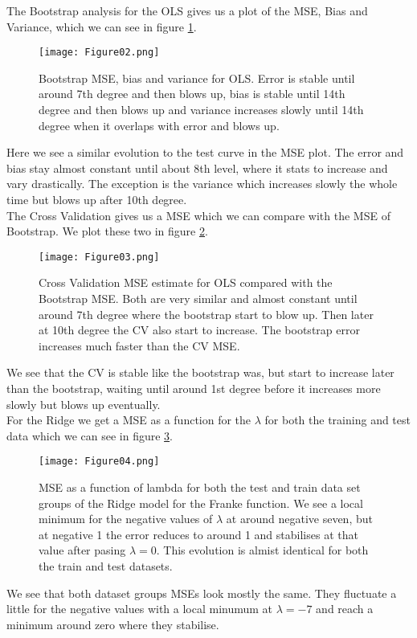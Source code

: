 \documentclass[11pt, A4paper, english]{article}
\begin{document}
\begin{multicols}{2}
The Bootstrap analysis for the OLS gives us a plot of the MSE, Bias and Variance, which we can see in figure \ref{Bootstrap_OLS}.
			\begin{figure}[H]
\texttt{[image: Figure02.png]}
\caption{Bootstrap MSE, bias and variance for OLS. Error is stable until around 7th degree and then blows up, bias is stable until 14th degree and then blows up and variance increases slowly until 14th degree when it overlaps with error and blows up.}
\label{Bootstrap_OLS}
			\end{figure}
Here we see a similar evolution to the test curve in the MSE plot. The error and bias stay almost constant until about 8th level, where it stats to increase and vary drastically. The exception is the variance which increases slowly the whole time but blows up after 10th degree. \\
The Cross Validation gives us a MSE which we can compare with the MSE of Bootstrap. We plot these two in figure \ref{CV_OLS}.
			\begin{figure}[H]
\texttt{[image: Figure03.png]}
\caption{Cross Validation MSE estimate for OLS compared with the Bootstrap MSE. Both are very similar and almost constant until around 7th degree where the bootstrap start to blow up. Then later at 10th degree the CV also start to increase. The bootstrap error increases much faster than the CV MSE.}
\label{CV_OLS}
			\end{figure}
We see that the CV is stable like the bootstrap was, but start to increase later than the bootstrap, waiting until around 1st degree before it increases more slowly but blows up eventually. \\
For the Ridge we get a MSE as a function for the $\lambda$ for both the training and test data which we can see in figure \ref{MSE_Ridge}.
			\begin{figure}[H]
\texttt{[image: Figure04.png]}
\caption{MSE as a function of lambda for both the test and train data set groups of the Ridge model for the Franke function. We see a local minimum for the negative values of $\lambda$ at around negative seven, but at negative 1 the error reduces to around 1 and stabilises at that value after pasing $\lambda = 0$. This evolution is almist identical for both the train and test datasets.}
\label{MSE_Ridge}
			\end{figure}
We see that both dataset groups MSEs look mostly the same. They fluctuate a little for the negative values with a local minumum at $\lambda = -7$ and reach a minimum around zero where they stabilise. \\

\end{multicols}
\end{document}
